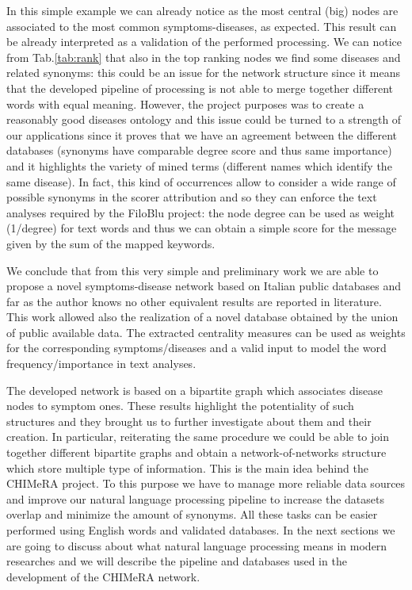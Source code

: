 \documentclass{standalone}
\begin{document}
In this simple example we can already notice as the most central (big) nodes are associated to the most common symptoms-diseases, as expected.
This result can be already interpreted as a validation of the performed processing.
We can notice from Tab.\ref{tab:rank} that also in the top ranking nodes we find some diseases and related synonyms: this could be an issue for the network structure since it means that the developed pipeline of processing is not able to merge together different words with equal meaning.
However, the project purposes was to create a reasonably good diseases ontology and this issue could be turned to a strength of our applications since it proves that we have an agreement between the different databases (synonyms have comparable degree score and thus same importance) and it highlights the variety of mined terms (different names which identify the same disease).
In fact, this kind of occurrences allow to consider a wide range of possible synonyms in the scorer attribution and so they can enforce the text analyses required by the FiloBlu project: the node degree can be used as weight (1/degree) for text words and thus we can obtain a simple score for the message given by the sum of the mapped keywords.

We conclude that from this very simple and preliminary work we are able to propose a novel symptoms-disease network based on Italian public databases and far as the author knows no other equivalent results are reported in literature.
This work allowed also the realization of a novel database obtained by the union of public available data.
The extracted centrality measures can be used as weights for the corresponding symptoms/diseases and a valid input to model the word frequency/importance in text analyses.

The developed network is based on a bipartite graph which associates disease nodes to symptom ones.
These results highlight the potentiality of such structures and they brought us to further investigate about them and their creation.
In particular, reiterating the same procedure we could be able to join together different bipartite graphs and obtain a network-of-networks structure which store multiple type of information.
This is the main idea behind the \textsf{CHIMeRA} project.
To this purpose we have to manage more reliable data sources and improve our natural language processing pipeline to increase the datasets overlap and minimize the amount of synonyms.
All these tasks can be easier performed using English words and validated databases.
In the next sections we are going to discuss about what natural language processing means in modern researches and we will describe the pipeline and databases used in the development of the \textsf{CHIMeRA} network.
\end{document}
